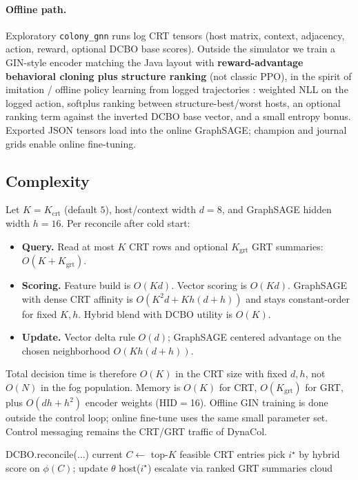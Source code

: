 \documentclass[11pt,a4paper]{article}
\begin{document}
\paragraph{Offline path.}
Exploratory \texttt{colony\_gnn} runs log CRT tensors (host matrix, context,
adjacency, action, reward, optional DCBO base scores). Outside the simulator we
train a GIN-style encoder \cite{xu_gin_iclr2019} matching the Java layout with
\textbf{reward-advantage behavioral cloning plus structure ranking} (not classic
PPO), in the spirit of imitation / offline policy learning from logged
trajectories \cite{ross_aistats2011_dagger,levine_offline_rl2020}: weighted NLL on the logged action, softplus ranking between
structure-best/worst hosts, an optional ranking term against the inverted DCBO
base vector, and a small entropy bonus. Exported JSON tensors load into the
online GraphSAGE; champion and journal grids enable online fine-tuning.

\subsection{Complexity}
\label{sec:complexity}
Let $K{=}K_{\mathrm{crt}}$ (default $5$), host/context width $d{=}8$, and GraphSAGE
hidden width $h{=}16$. Per reconcile after cold start:
\begin{itemize}
\item \textbf{Query.} Read at most $K$ CRT rows and optional $K_{\mathrm{grt}}$ GRT
summaries: $O(K+K_{\mathrm{grt}})$.
\item \textbf{Scoring.} Feature build is $O(Kd)$. Vector scoring is $O(Kd)$.
GraphSAGE with dense CRT affinity is $O(K^2 d+K h(d+h))$ and stays constant-order
for fixed $K,h$. Hybrid blend with DCBO utility is $O(K)$.
\item \textbf{Update.} Vector delta rule $O(d)$; GraphSAGE centered advantage on
the chosen neighborhood $O(K h(d+h))$.
\end{itemize}
Total decision time is therefore $O(K)$ in the CRT size with fixed $d,h$, not
$O(N)$ in the fog population. Memory is $O(K)$ for CRT, $O(K_{\mathrm{grt}})$ for
GRT, plus $O(dh+h^2)$ encoder weights (HID$=$16). Offline GIN training is done
outside the control loop; online fine-tune uses the same small parameter set.
Control messaging remains the CRT/GRT traffic of DynaCol.

\begin{algorithm}[t]
\caption{Colony-bounded hybrid reconcile (sketch)}
\label{alg:reconcile}
\begin{algorithmic}[1]
    \State \Return DCBO.reconcile($\ldots$)
  \EndIf
    \State \Return current
  \EndIf
    \State $C\leftarrow$ top-$K$ feasible CRT entries
    \State pick $i^\star$ by hybrid score on $\phi(C)$; update $\theta$
    \State \Return host($i^\star$)
  \EndIf
    \State escalate via ranked GRT summaries
  \EndIf
  \State \Return cloud 
\EndProcedure
\end{algorithmic}
\end{algorithm}
\end{document}
